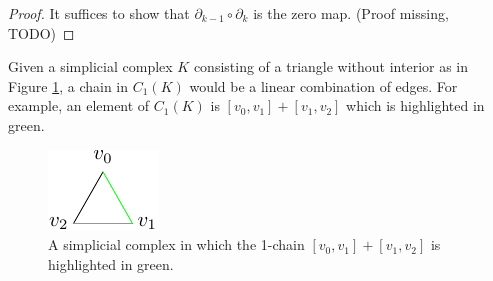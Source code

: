 \begin{proof}
It suffices to show that $\partial_{k-1} \circ \partial_{k}$ is the zero map. (Proof missing, TODO)
  \end{proof}

%
%
\begin{example}
Given a simplicial complex $K$ consisting of a triangle without interior as in Figure \ref{trichain}, a chain in $C_{1}(K)$ would be a linear combination of edges. For example, an element of $C_{1}(K)$ is $[v_{0},v_{1}]+[v_{1},v_{2}]$ which is highlighted in green.
\begin{figure}[ht]
  \centering
  \includegraphics[scale=2]{trichain.pdf}
  \caption{\label{trichain} A simplicial complex in which the 1-chain $[v_{0},v_{1}]+[v_{1},v_{2}]$ is highlighted in green.}
\end{figure}
\end{example}

